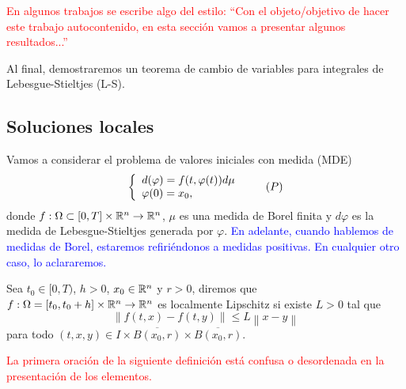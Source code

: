 \textcolor{red}{ 
  En algunos trabajos se escribe algo del estilo: 
  ``Con el objeto/objetivo de hacer este trabajo autocontenido, en esta sección vamos a presentar  algunos resultados...''}
  
  Al final, demostraremos un teorema de cambio de variables para integrales de Lebesgue-Stieltjes (L-S).
 \subsection{Soluciones locales}

 Vamos a considerar el problema de valores iniciales con medida (MDE)
 \begin{equation}\label{Problema P}
 	\left\lbrace \begin{array}{l}
 		d(\varphi)=f(t,\varphi(t))d\mu\\
 		\varphi(0)=x_0,
 	\end{array}\right. \tag{${P}$}
 \end{equation}
 donde $f:\Omega\subset[0,T]\times\mathbb{R}^n\to\mathbb{R}^{n}$, $\mu$ es una medida de Borel finita y $d\varphi$ es la medida de Lebesgue-Stieltjes generada por $\varphi$. \textcolor{blue}{ En adelante, cuando hablemos de medidas de Borel, estaremos refiriéndonos a medidas  positivas. En cualquier otro caso, lo aclararemos.}
 


\begin{defi}
    Sea $t_0\in [0,T)$, $h>0$,  $x_0\in \mathbb{R}^n$ y $r>0$, diremos que $f:\Omega=[t_0,t_0+h]\times\mathbb{R}^n\to\mathbb{R}^{n}$ es localmente Lipschitz  si  existe $ L>0$  tal que
	\begin{equation}\label{f lipschitz}
	\left\| f(t,x)-f(t,y)\right\|\leq L\left\| x-y\right\|
\end{equation}
	para todo $(t,x,y)\in I\times \overline{B(x_0,r)}\times \overline{B(x_0,r)}$.
\end{defi}

 \textcolor{red}{La primera oración de la siguiente definición está confusa o desordenada en la presentación de los elementos.}



